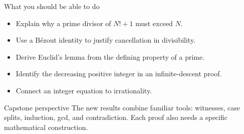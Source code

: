 

\begin{frame}\titlepage\end{frame}

\begin{frame}{What you should be able to do}
\begin{itemize}
\item Explain why a prime divisor of $N!+1$ must exceed $N$.
\item Use a B\'ezout identity to justify cancellation in divisibility.
\item Derive Euclid's lemma from the defining property of a prime.
\item Identify the decreasing positive integer in an infinite-descent proof.
\item Connect an integer equation to irrationality.
\end{itemize}
\begin{block}{Capstone perspective}
The new results combine familiar tools: witnesses, case splits, induction, gcd, and contradiction. Each proof also needs a specific mathematical construction.
\end{block}
\end{frame}

